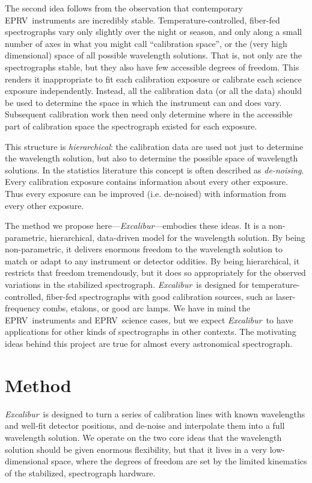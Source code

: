 \documentclass[twocolumn]{aastex63}
\newcommand{\project}[1]{\textsl{#1}}
\newcommand{\name}{\project{Excalibur}}
\newcommand{\acronym}[1]{{\small{#1}}}
\newcommand{\eprv}{\acronym{EPRV}}
\begin{document}
The second idea follows from the observation that contemporary \eprv\ instruments are incredibly stable.  Temperature-controlled, fiber-fed spectrographs vary only slightly over the night or season, and only along a small number of axes in what you might call ``calibration space'', or the (very high dimensional) space of all possible wavelength solutions.  That is, not only are the spectrographs stable, but they also have few accessible degrees of freedom.  This renders it inappropriate to fit each calibration exposure or calibrate each science exposure independently.  Instead, all the calibration data (or all the data) should be used to determine the space in which the instrument can and does vary.  Subsequent calibration work then need only determine where in the accessible part of calibration space the spectrograph existed for each exposure.

This structure is \emph{hierarchical}: the calibration data are used not just to determine the wavelength solution, but also to determine the possible space of wavelength solutions.  In the statistics literature this concept is often described as \emph{de-noising}.  Every calibration exposure contains information about every other exposure.  Thus every exposure can be improved (i.e. de-noised) with information from every other exposure.

The method we propose here---\name---embodies these ideas.
It is a non-parametric, hierarchical, data-driven model for the wavelength solution.  By being non-parametric, it delivers enormous freedom to the wavelength solution to match or adapt to any instrument or detector oddities.  By being hierarchical, it restricts that freedom tremendously, but it does so appropriately for the observed variations in the stabilized spectrograph.  \name\ is designed for temperature-controlled, fiber-fed spectrographs with good calibration sources, such as laser-frequency combs, etalons, or good arc lamps.  We have in mind the \eprv\ instruments and \eprv\ science cases, but we expect \name\ to have applications for other kinds of spectrographs in other contexts.  The motivating ideas behind this project are true for almost every astronomical spectrograph.

\section{Method} \label{sec:method}
\name\ is designed to turn a series of calibration lines with known wavelengths and well-fit detector positions, and de-noise and interpolate them into a full wavelength solution.  We operate on the two core ideas that the wavelength solution should be given enormous flexibility, but that it lives in a very low-dimensional space, where the degrees of freedom are set by the limited kinematics of the stabilized, spectrograph hardware.
\end{document}
